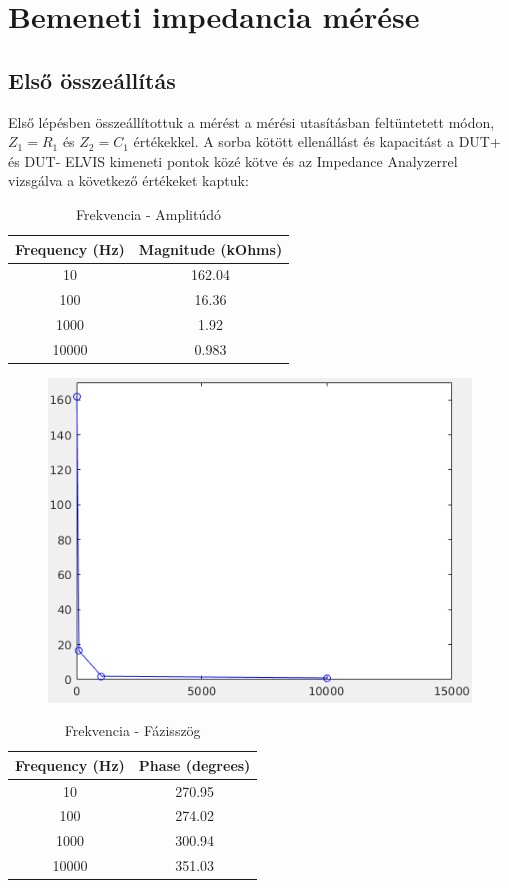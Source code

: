 \documentclass[10pt, conference,a4paper]{ITKproc}
\begin{document}
\section{Bemeneti impedancia mérése}
\subsection{Első összeállítás}

Első lépésben összeállítottuk a mérést a mérési utasításban feltüntetett módon, $Z_1 = R_1$ és $Z_2 = C_1$ értékekkel. A sorba kötött ellenállást és kapacitást a DUT+ és DUT- ELVIS kimeneti pontok közé kötve és az Impedance Analyzerrel vizsgálva a következő értékeket kaptuk:

\begin{table}[ht!]
\renewcommand{\arraystretch}{1.3}
\caption{Frekvencia - Amplitúdó}
\centering
\begin{tabular}{c||c}
\hline
\bfseries Frequency (Hz) & \bfseries Magnitude (kOhms) \\
\hline\hline
 10 & 162.04\\
\hline
 100 & 16.36\\
\hline
1000 & 1.92\\
\hline
10000 & 0.983\\
\hline
\end{tabular}
\end{table}
\begin{figure}[h]
\includegraphics[scale=0.3]{1_f_m}
\centering

\end{figure}

\begin{table}[ht!]
\renewcommand{\arraystretch}{1.3}
\caption{Frekvencia - Fázisszög}
\centering
\begin{tabular}{c||c}
\hline
\bfseries Frequency (Hz) & \bfseries Phase (degrees) \\
\hline\hline
 10 & 270.95\\
\hline
 100 & 274.02\\
\hline
1000 & 300.94\\
\hline
10000 & 351.03\\
\hline

\end{tabular}
\end{table}
\end{document}
